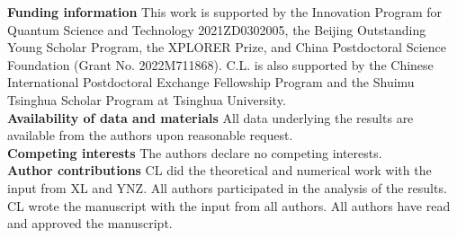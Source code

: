 \documentclass[twocolumn,aps,prb,english]{revtex4-2}
\begin{document}
\noindent
{\bf Funding information}
This work is supported by the Innovation Program for Quantum Science and Technology 2021ZD0302005, the Beijing Outstanding Young Scholar Program, the XPLORER Prize, and China Postdoctoral Science Foundation (Grant No. 2022M711868). C.L. is also supported by the Chinese International Postdoctoral Exchange Fellowship Program and the Shuimu Tsinghua Scholar Program at Tsinghua University. \\

\noindent
{\bf Availability of data and materials}
All data underlying the results are available from the authors upon reasonable request.\\

\noindent
{\bf Competing interests}
The authors declare no competing interests.\\

\noindent
{\bf Author contributions}
CL did the theoretical and numerical work with the input from XL and YNZ. All authors participated in the analysis of the results. CL wrote the manuscript with the input from all authors. All authors have read and approved the manuscript.


\end{document}
